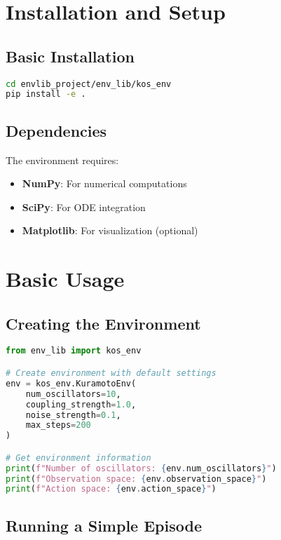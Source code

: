 \section{Installation and Setup}

\subsection{Basic Installation}

\begin{lstlisting}[language=bash, caption=Install Kuramoto Environment]
cd envlib_project/env_lib/kos_env
pip install -e .
\end{lstlisting}

\subsection{Dependencies}

The environment requires:
\begin{itemize}
    \item \textbf{NumPy}: For numerical computations
    \item \textbf{SciPy}: For ODE integration
    \item \textbf{Matplotlib}: For visualization (optional)
\end{itemize}

\section{Basic Usage}

\subsection{Creating the Environment}

\begin{lstlisting}[language=python, caption=Basic Environment Creation]
from env_lib import kos_env

# Create environment with default settings
env = kos_env.KuramotoEnv(
    num_oscillators=10,
    coupling_strength=1.0,
    noise_strength=0.1,
    max_steps=200
)

# Get environment information
print(f"Number of oscillators: {env.num_oscillators}")
print(f"Observation space: {env.observation_space}")
print(f"Action space: {env.action_space}")
\end{lstlisting}

\subsection{Running a Simple Episode}

